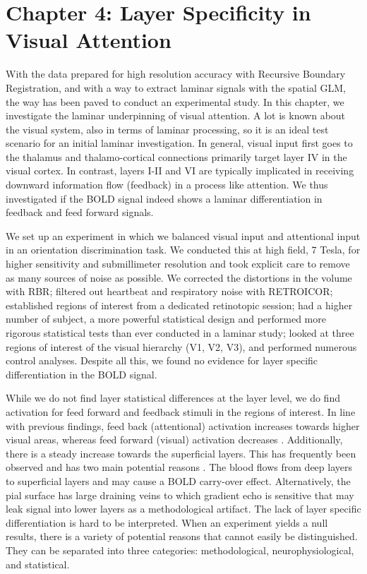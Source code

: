 \section*{Chapter 4: Layer Specificity in Visual Attention}
With the data prepared for high resolution accuracy with Recursive Boundary Registration, and with a way to extract laminar signals with the spatial GLM, the way has been paved to conduct an experimental study. In this chapter, we investigate the laminar underpinning of visual attention. A lot is known about the visual system, also in terms of laminar processing, so it is an ideal test scenario for an initial laminar investigation. In general, visual input first goes to the thalamus and thalamo-cortical connections primarily target layer IV in the visual cortex. In contrast, layers I-II and VI are typically implicated in receiving downward information flow (feedback) in a process like attention. We thus investigated if the BOLD signal indeed shows a laminar differentiation in feedback and feed forward signals. 

We set up an experiment in which we balanced visual input and attentional input in an orientation discrimination task. We conducted this at high field, 7 Tesla, for higher sensitivity and submillimeter resolution and took explicit care to remove as many sources of noise as possible. We corrected the distortions in the volume with RBR; filtered out heartbeat and respiratory noise with RETROICOR; established regions of interest from a dedicated retinotopic session; had a higher number of subject, a more powerful statistical design and performed more rigorous statistical tests than ever conducted in a laminar study; looked at three regions of interest of the visual hierarchy (V1, V2, V3), and performed numerous control analyses. Despite all this, we found no evidence for layer specific differentiation in the BOLD signal.

While we do not find layer statistical differences at the layer level, we do find activation for feed forward and feedback stimuli in the regions of interest. In line with previous findings, feed back (attentional) activation increases towards higher visual areas, whereas feed forward (visual) activation decreases \cite{Murray2008,Jehee2011}. Additionally, there is a steady increase towards the superficial layers. This has frequently been observed and has two main potential reasons \cite{Koopmans2010,Polimeni2010}. The blood flows from deep layers to superficial layers and may cause a BOLD carry-over effect. Alternatively, the pial surface has large draining veins to which gradient echo is sensitive that may leak signal into lower layers as a methodological artifact. The lack of layer specific differentiation is hard to be interpreted. When an experiment yields a null results, there is a variety of potential reasons that cannot easily be distinguished. They can be separated into three categories: methodological, neurophysiological, and statistical. 

